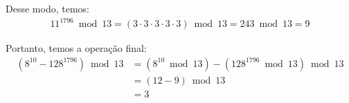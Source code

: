 Desse modo, temos:
\begin{align*}
	11^{1796} \bmod{13} = (3 \cdot 3 \cdot 3 \cdot 3 \cdot 3) \bmod{13} = 243 \bmod{13} = 9
\end{align*}

Portanto, temos a operação final:
\begin{align*}
	(8^{10} - 128^{1796}) \bmod{13} &= (8^{10} \bmod{13}) - (128^{1796} \bmod{13}) \bmod{13} \\
	&= (12 - 9) \bmod{13} \\ 
	&= 3
\end{align*}
